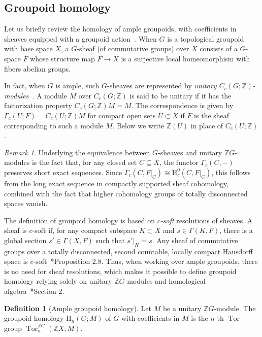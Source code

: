 \documentclass[a4paper,reqno]{amsart}
\theoremstyle{plain}
\theoremstyle{definition}
\newtheorem{definition}[theorem]{Definition}
\theoremstyle{remark}
\newtheorem{remark}[theorem]{Remark}
\numberwithin{equation}{section}
\newcommand{\rH}{\mathrm{H}}
\newcommand{\dZ}{\mathbb{Z}}
\DeclareMathOperator{\Tor}{Tor}
\begin{document}
\subsection{Groupoid homology}\label{sec:gr-hom}

Let us briefly review the homology of ample groupoids, with coefficients in sheaves equipped with a groupoid action~\cite{cramo:hom}. When $G$ is a topological groupoid with base space $X$, a $G$-sheaf (of commutative groups) over $X$ consists of a $G$-space $F$ whose structure map $F\to X$ is a surjective local homeomorphism with fibers abelian groups.

In fact, when $G$ is ample, such $G$-sheaves are represented by \emph{unitary $C_c(G; \dZ)$-modules}~\cite{stein:amplesheafmod}. A module $M$ over $C_c(G; \dZ)$ is said to be unitary if it has the factorization property $C_c(G; \dZ) M = M$. The correspondence is given by $\Gamma_c(U; F) = C_c(U; \dZ) M$ for compact open sets $U \subset X$ if $F$ is the sheaf corresponding to such a module $M$.
Below we write $\dZ(U)$ in place of $C_c(U; \dZ)$.

\begin{remark}%
Underlying the equivalence between $G$-sheaves and unitary $\dZ G$-modules is the fact that, for any closed set $C\subseteq X$, the functor $\Gamma_c(C,-)$ preserves short exact sequences. Since $\Gamma_c(C,F|_C)\cong \rH^0_c(C,F|_C)$, this follows from the long exact sequence in compactly supported sheaf cohomology, combined with the fact that higher cohomology groups of totally disconnected spaces vanish.
\end{remark}

The definition of groupoid homology is based on \emph{$c$-soft} resolutions of sheaves. A sheaf is $c$-soft if, for any compact subspace $K \subset X$ and $s \in \Gamma(K, F)$, there is a global section $s' \in \Gamma(X, F)$ such that $s'|_K = s$. Any sheaf of commutative groups over a totally disconnected, second countable, locally compact Hausdorff space is $c$-soft~\cite{py:part-one}*{Proposition 2.8}. Thus, when working over ample groupoids, there is no need for sheaf resolutions, which makes it possible to define groupoid homology relying solely on unitary $\dZ G$-modules and homological algebra~\cite{bdgw:matui}*{Section 2}.

\begin{definition}[Ample groupoid homology]
Let $M$ be a unitary $\dZ G$-module. The groupoid homology $\rH_n(G;M)$ of $G$ with coefficients in $M$ is the $n$-th $\Tor$ group $\Tor^{\dZ G}_n(\dZ X, M)$.
\end{definition}
\end{document}

